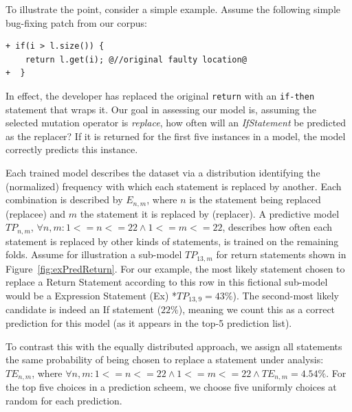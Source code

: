 \documentclass[conference]{IEEEtran}
\begin{document}

To illustrate the point, consider a simple example. Assume the following
simple bug-fixing patch from our corpus: 

\begin{lstlisting}[frame=single,style=base]
+ if(i > l.size()) {
    return l.get(i); @//original faulty location@
+  }    
\end{lstlisting}

In effect, the developer has replaced the original \texttt{return} with an
\texttt{if-then} statement that wraps it.  Our goal in assessing our model is,
assuming the selected mutation operator 
is \emph{replace}, how often will an \emph{IfStatement} be predicted as the
replacer? If it is returned for the first five instances in a model, the model
correctly predicts this instance.  

Each trained model describes the dataset via
a distribution identifying the (normalized) frequency with which each statement is replaced 
by another. Each combination is described by 
$E_{n,m}$, 
where $n$ is the statement being replaced (replacee) and $m$ the statement it is 
replaced by (replacer).  A predictive model $TP_{n,m}$, $\forall n,m: 1<=n<=22 \land 1<=m<=22$, 
describes how often each statement is replaced by 
other kinds of statements, is trained on the remaining folds. 
Assume for illustration a sub-model $TP_{13,m}$ for return statements shown in Figure~\ref{fig:exPredReturn}.
%
For our example, the most
likely statement chosen to replace a Return Statement according to this row in 
this fictional sub-model would be a Expression Statement (Ex) *$TP_{13,9} = 43\%$). 
The second-most likely candidate is indeed an If statement ($22\%$),
meaning we count this as a correct prediction for this model (as it appears in
the top-5 prediction list). 

To contrast this with the equally distributed approach,
we assign all statements the same probability of being chosen to replace 
a statement under analysis:
$TE_{n,m}$, where $\forall n,m: 1<=n<=22 \land 1<=m<=22 \land TE_{n,m} = 4.54\%$. 
For the top five choices in a prediction scheem, we choose five uniformly choices at
random for each prediction. 
\end{document}
